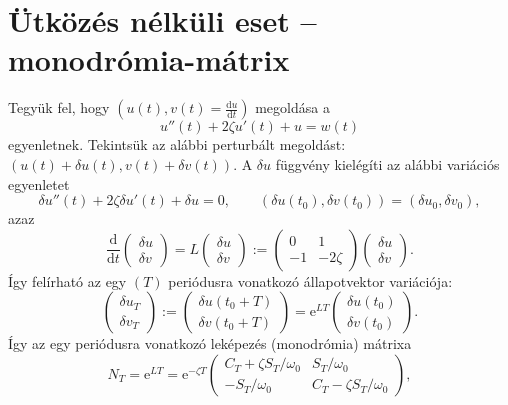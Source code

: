 \section{Ütközés nélküli eset -- monodrómia-mátrix}
Tegyük fel, hogy $\left(u(t),v(t)=\frac{\mathrm{d}u}{\mathrm{d}t}\right)$ megoldása a
\begin{equation}
u''(t)+2\zeta u'(t)+u=w(t)
\end{equation}
egyenletnek. Tekintsük az alábbi perturbált megoldást: $\left(u(t)+\delta u(t),v(t)+\delta v(t)\right)$. A $\delta u$ függvény kielégíti az alábbi variációs egyenletet
\begin{equation}
\delta u''(t)+2\zeta \delta u'(t)+\delta u=0,\qquad \left(\delta u(t_0),\delta v(t_0) \right)=\left(\delta u_0,\delta v_0 \right),
\end{equation}
azaz
\begin{equation}
\frac{\mathrm{d}}{\mathrm{d}t}\begin{pmatrix}
\delta u\\ \delta v
\end{pmatrix}=L\begin{pmatrix}
\delta u\\ \delta v
\end{pmatrix}:=\begin{pmatrix}
0 & 1 \\
-1 & -2\zeta
\end{pmatrix}\begin{pmatrix}
\delta u\\ \delta v
\end{pmatrix}.
\end{equation}
Így felírható az egy $(T)$ periódusra vonatkozó állapotvektor variációja:
\begin{equation}
\begin{pmatrix}
\delta u_T\\ \delta v_T
\end{pmatrix}:=
\begin{pmatrix}
\delta u(t_0+T)\\
\delta v(t_0+T)
\end{pmatrix}
=\mathrm{e}^{LT}\begin{pmatrix}
\delta u(t_0)\\ \delta v(t_0)
\end{pmatrix}.
\end{equation}
Így az egy periódusra vonatkozó leképezés (monodrómia) mátrixa
\begin{equation}\label{eq:Nt}
N_T=\mathrm{e}^{LT}=\mathrm{e}^{-\zeta T}
\begin{pmatrix}
C_T+\zeta S_T/\omega_0 & S_T/\omega_0\\
-S_T/\omega_0 & C_T-\zeta S_T/\omega_0
\end{pmatrix},
\end{equation}
